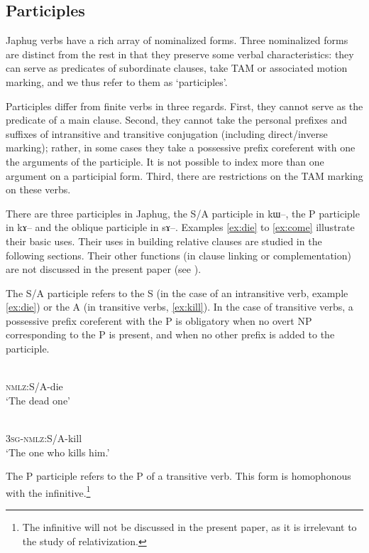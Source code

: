 \documentclass[oldfontcommands,oneside,a4paper,11pt]{article}
\newcommand{\ipa}[1]{{\phon #1}} %
\begin{document}
\subsection{Participles}
Japhug verbs have a rich array of nominalized forms. Three nominalized forms are distinct from the rest in that they preserve some verbal characteristics: they can serve as predicates of subordinate clauses, take TAM or associated motion marking, and we thus refer to them as `participles'. 

Participles differ from finite verbs in three regards. First, they cannot serve as the predicate of a main clause. Second, they cannot take the personal prefixes and suffixes of intransitive and transitive conjugation (including direct/inverse marking); rather, in some cases they take a possessive prefix coreferent with one the arguments of the participle. It is not possible to index more than one argument on a participial form. Third, there are restrictions on the TAM marking on these verbs.

There are three participles in Japhug, the S/A participle in \ipa{kɯ--}, the P participle in \ipa{kɤ--} and the oblique participle in \ipa{sɤ--}. Examples \ref{ex:die} to \ref{ex:come} illustrate their basic uses. Their uses in building relative clauses are studied in the following sections. Their other functions (in clause linking or complementation) are not discussed in the present paper (see \citealt{jacques14linking}).

The S/A participle refers to the S (in the case of an intransitive verb, example \ref{ex:die}) or the A (in transitive verbs, \ref{ex:kill}). In the case of transitive verbs, a possessive prefix coreferent with the P is obligatory when no overt NP corresponding to the P is present, and when no other prefix is added to the participle.

 \begin{exe}
\ex \label{ex:die}
\gll \ipa{kɯ-si}    \\
  \textsc{nmlz}:S/A-die \\
 \glt  `The dead one'
\end{exe}

 \begin{exe} 
\ex \label{ex:kill}
\gll \ipa{ɯ-kɯ-sat}    \\
  \textsc{3sg}-\textsc{nmlz}:S/A-kill \\
 \glt  `The one who kills him.'
\end{exe}

The P participle refers to the P of a transitive verb. This form is homophonous with the infinitive.\footnote{The infinitive will not be discussed in the present paper, as it is irrelevant to the study of relativization.}
\end{document}
